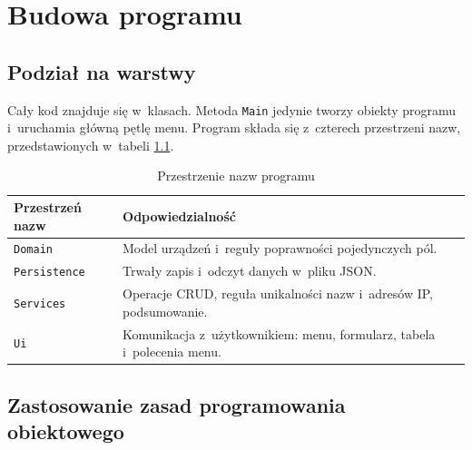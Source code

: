 \chapter{Budowa programu}\label{ch:budowa}

\section{Podział na warstwy}

Cały kod znajduje się w~klasach. Metoda \texttt{Main} jedynie tworzy obiekty programu i~uruchamia główną pętlę menu. Program składa się z~czterech przestrzeni nazw, przedstawionych w~tabeli \ref{tab:warstwy}.

\begin{table}[H]
	\begin{center}
		\caption{\footnotesize Przestrzenie nazw programu}
		\label{tab:warstwy}
		\begin{small}
			\begin{tabular}{|l|p{11.5cm}|} \hline
				\textbf{Przestrzeń nazw} & \textbf{Odpowiedzialność} \\ \hline
				\texttt{Domain} & Model urządzeń i~reguły poprawności pojedynczych pól. \\ \hline
				\texttt{Persistence} & Trwały zapis i~odczyt danych w~pliku JSON. \\ \hline
				\texttt{Services} & Operacje CRUD, reguła unikalności nazw i~adresów IP, podsumowanie. \\ \hline
				\texttt{Ui} & Komunikacja z~użytkownikiem: menu, formularz, tabela i~polecenia menu. \\ \hline
			\end{tabular}
		\end{small}
	\end{center}
\end{table}

\section{Zastosowanie zasad programowania obiektowego}

